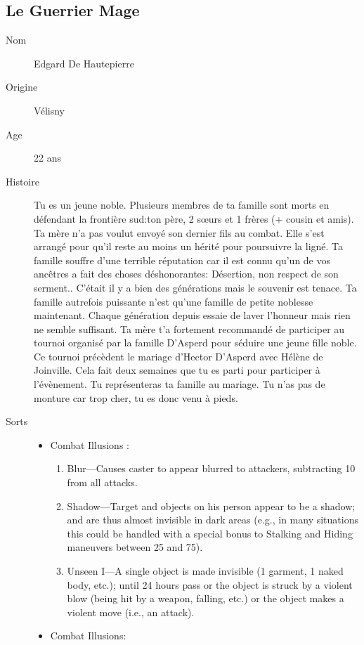 \documentclass[oneside,12pt]{book}
\begin{document}
\begin{flushleft}
\subsection{Le Guerrier Mage}
\begin{description}
\item[Nom]{Edgard De Hautepierre}
\item[Origine]{Vélisny}
\item[Age]{22 ans}
\item[Histoire]{
\small Tu es un jeune noble. Plusieurs membres de ta famille sont morts en défendant la frontière sud:ton père, 2 sœurs et 1 frères (+ cousin et amis). Ta mère n'a pas voulut envoyé son dernier fils au combat. Elle s'est arrangé pour qu'il reste au moins un hérité pour poursuivre la ligné. Ta famille souffre d'une terrible réputation car il est connu qu'un de vos ancêtres a fait des choses déshonorantes: Désertion, non respect de son serment.. C'était il y a bien des générations mais le souvenir est tenace. Ta famille autrefois puissante n'est qu'une famille de petite noblesse maintenant. Chaque génération depuis essaie de laver l'honneur mais rien ne semble suffisant. Ta mère t'a fortement recommandé de participer au tournoi organisé par la famille D'Asperd pour séduire une jeune fille noble. Ce tournoi précèdent le mariage d'Hector D'Asperd avec Hélène de Joinville. Cela fait deux semaines que tu es parti pour participer à l'évènement. Tu représenteras ta famille au mariage.  Tu n'as pas de monture car trop cher, tu es donc venu à pieds. }
\item[Sorts]{
\begin{itemize}
\item Combat Illusions :
\begin{enumerate}
\scriptsize
\item Blur—Causes caster to appear blurred to attackers,
subtracting 10 from all attacks.
\item Shadow—Target and objects on his person appear to
be a shadow; and are thus almost invisible in dark
areas (e.g., in many situations this could be handled
with a special bonus to Stalking and Hiding maneuvers
between 25 and 75).
\item Unseen I—A single object is made invisible (1 garment, 1
naked body, etc.); until 24 hours pass or the object is
struck by a violent blow (being hit by a weapon, falling,
etc.) or the object makes a violent move (i.e., an attack).
\end{enumerate}
\item Combat Illusions:

\end{itemize}}
\end{description}
\end{flushleft}
\end{document}
